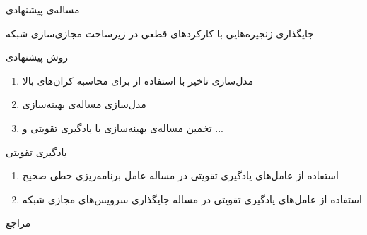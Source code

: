 \documentclass[dvipsnames]{beamer}
\makeatletter
\newcommand{\RTList}{\raggedleft\rightskip\@totalleftmargin}
\makeatother
\begin{document}
\begin{persian}
	\begin{frame}{مساله‌ی پیشنهادی}
		\begin{block}{}
			\centering
			جایگذاری زنجیره‌هایی با کارکردهای قطعی در زیرساخت مجازی‌سازی شبکه
		\end{block}
	\end{frame}

	\begin{frame}{روش‌ پیشنهادی}
		\begin{enumerate}\RTList{}
				\justifying%
				\item مدل‌سازی تاخیر با استفاده از  برای محاسبه کران‌های بالا
				\item مدل‌سازی مساله‌ی بهینه‌سازی
				\item تخمین مساله‌ی بهینه‌سازی با یادگیری تقویتی و ...
		\end{enumerate}
	\end{frame}

	\begin{frame}{یادگیری تقویتی}
		\begin{enumerate}\RTList{}
				\justifying%
				\item استفاده از عامل‌های یادگیری تقویتی در مساله عامل برنامه‌ریزی خطی صحیح
				\begin{latin}
				\scriptsize{}
				\end{latin}
				\item استفاده از عامل‌های یادگیری تقویتی در مساله جایگذاری سرویس‌های مجازی شبکه
		\end{enumerate}
	\end{frame}

	\begin{frame}[allowframebreaks]{مراجع}
		\begin{latin}
		\printbibliography[title=مراجع]
		\end{latin}
	\end{frame}

\end{persian}
\end{document}
